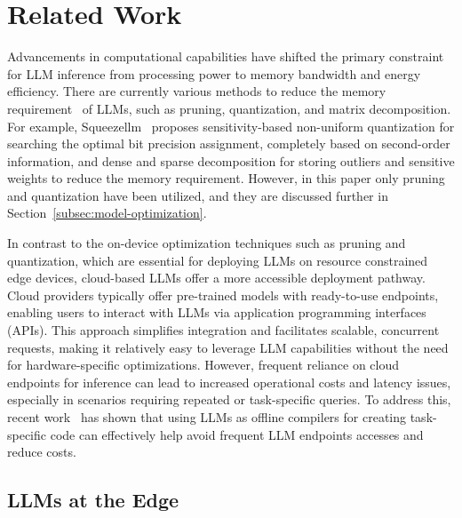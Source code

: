 
\section{Related Work}
\label{sec:rw} 

Advancements in computational capabilities have shifted the primary constraint for LLM inference from processing power to memory bandwidth and energy efficiency. 
There are currently various methods to reduce the memory requirement~\cite{ojika2020addressing} of LLMs, such as pruning, quantization, and matrix decomposition. 
For example, Squeezellm~\cite{kim2023squeezellm} proposes sensitivity-based non-uniform quantization for searching the optimal bit precision assignment, completely based on second-order information, and dense and sparse decomposition for storing outliers and sensitive weights to reduce the memory requirement.
However, in this paper only pruning and quantization have been utilized, and they are discussed further in Section~\ref{subsec:model-optimization}.

In contrast to the on-device optimization techniques such as pruning and quantization, which are essential for deploying LLMs on resource constrained edge devices, cloud-based LLMs offer a more accessible deployment pathway. Cloud providers typically offer pre-trained models with ready-to-use endpoints, enabling users to interact with LLMs via application programming interfaces (APIs). This approach simplifies integration and facilitates scalable, concurrent requests, making it relatively easy to leverage LLM capabilities without the need for hardware-specific optimizations. 
However, frequent reliance on cloud endpoints for inference can lead to increased operational costs and latency issues, especially in scenarios requiring repeated or task-specific queries. To address this, recent work~\cite{dong2024creating} has shown that using LLMs as offline compilers for creating task-specific code can effectively help avoid frequent LLM endpoints accesses and reduce costs. 



\subsection{LLMs at the Edge}

